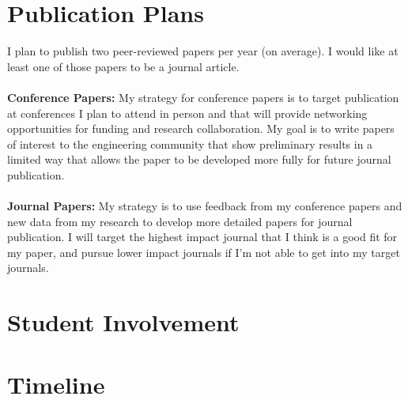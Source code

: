 \documentclass[10pt,letterpaper]{article}
\begin{document}
\section{Publication Plans}
I plan to publish two peer-reviewed papers per year (on average).
I would like at least one of those papers to be a journal article.
\\
\\
\noindent \textbf{Conference Papers:} My strategy for conference papers is to target publication at conferences I plan to attend in person and that will provide networking opportunities for funding and research collaboration.
My goal is to write papers of interest to the engineering community that show preliminary results in a limited way that allows the paper to be developed more fully for future journal publication.
\\
\\
\noindent \textbf{Journal Papers:} My strategy is to use feedback from my conference papers and new data from my research to develop more detailed papers for journal publication. 
I will target the highest impact journal that I think is a good fit for my paper, and pursue lower impact journals if I'm not able to get into my target journals.
\section{Student Involvement}


\section{Timeline}
\end{document}
